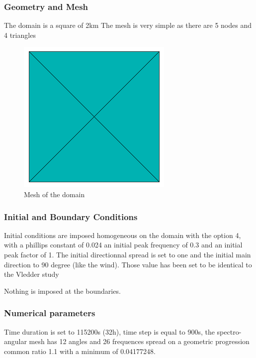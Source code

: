 \subsubsection{Geometry and Mesh}
%
The domain is a square of 2km
The mesh is very simple as there are 5 nodes and 4 triangles
\begin{figure} [!h]
\centering
\includegraphics[scale = 0.65]{maillage.png}
 \caption{Mesh of the domain}
\label{mailTW}
\end{figure}
%
%
\subsubsection{Initial and Boundary Conditions}
%
Initial conditions are imposed homogeneous on the domain with the option 4, with a phillips constant of 0.024 an initial peak frequency of 0.3  and an initial peak factor of 1.  The initial directionnal spread is set to one and the initial main direction to 90 degree (like the wind).
Those value has been set to be identical to the Vledder study \cite{vledder}

Nothing is imposed at the boundaries.
%
%
\subsubsection{Numerical parameters}
Time duration is set to 115200s (32h), time step is equal to 900s, the spectro-angular mesh has 12 angles and 26 frequences spread on a geometric progression common ratio 1.1 with a minimum of 0.04177248.

%
%
